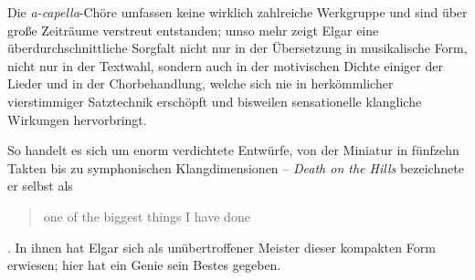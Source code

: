 \documentclass[a4paper,11pt,open=any]{scrbook}
\newcommand{\engquote}[1]{\foreignblockquote{english}{#1}}
\begin{document}
Die \textit{a-capella}-Chöre umfassen keine wirklich zahlreiche Werkgruppe
und sind über große Zeiträume verstreut entstanden; umso mehr zeigt Elgar
eine überdurchschnittliche Sorgfalt nicht nur in der Übersetzung in
musikalische Form, nicht nur in der Textwahl, sondern auch in der
motivischen Dichte einiger der Lieder und in der Chorbehandlung,
welche sich nie in herkömmlicher vierstimmiger Satztechnik erschöpft
und bisweilen sensationelle klangliche Wirkungen hervorbringt.

So handelt es sich um enorm verdichtete Entwürfe, von der Miniatur in
fünfzehn Takten bis zu symphonischen Klangdimensionen – \textit{Death on
the Hills} bezeichnete er selbst als \engquote{one of the biggest things
I have done}\cite[In einem Brief an Alice Stuart-Wortley, zitiert nach]
[S.~660]{moore}.  In ihnen hat Elgar sich als unübertroffener Meister
dieser kompakten Form erwiesen; hier hat ein Genie sein Bestes gegeben.
\end{document}
